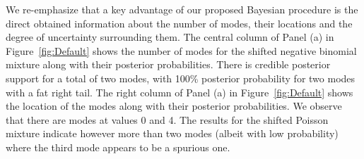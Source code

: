 \documentclass[11pt]{article}
\begin{document}
We re-emphasize that a key advantage of our proposed Bayesian procedure is the direct obtained information about the number of modes, their locations and the degree of uncertainty surrounding them. The central column of Panel (a) in Figure~\ref{fig:Default} shows the number of modes for the shifted negative binomial mixture along with their posterior probabilities. There is credible posterior support for a total of two modes, with 100\% posterior probability for two modes with a fat right tail. The right column of Panel (a) in Figure~\ref{fig:Default} shows the location of the modes along with their posterior probabilities. We observe that there are modes at values 0 and 4. The results for the shifted Poisson mixture indicate however more than two modes (albeit with low probability) where the third mode appears to be  a spurious one.


\end{document}
